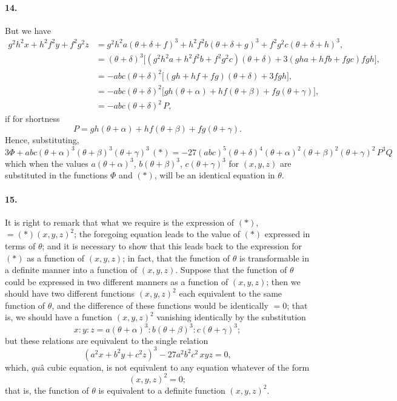 \documentclass[11pt,a4paper]{article}
\begin{document}
\paragraph{14.}
But we have
\[
\begin{aligned}
g^2 h^2 x + h^2 f^2 y + f^2 g^2 z
 &= g^2 h^2 a (\theta + \delta + f)^3 + h^2 f^2 b (\theta + \delta + g)^3
    + f^2 g^2 c (\theta + \delta + h)^3, \\
 &= (\theta + \delta)^3 \bigl[ (g^2 h^2 a + h^2 f^2 b + f^2 g^2 c)(\theta + \delta)
    + 3 (gha + hfb + fgc) fgh \bigr], \\
 &= - abc (\theta + \delta)^2 \bigl[ (gh + hf + fg)(\theta + \delta) + 3 fgh \bigr], \\
 &= - abc (\theta + \delta)^2 \bigl[ gh(\theta + \alpha) + hf(\theta + \beta) + fg(\theta + \gamma) \bigr], \\
 &= - abc (\theta + \delta)^2 \, P,
\end{aligned}
\]
if for shortness
\[
P = gh(\theta + \alpha) + hf(\theta + \beta) + fg(\theta + \gamma).
\]
Hence, substituting,
\[
3 \Phi + abc (\theta + \alpha)^3 (\theta + \beta)^3 (\theta + \gamma)^3 \, (*)
 = - 27 (abc)^5 (\theta + \delta)^4
   (\theta + \alpha)^2 (\theta + \beta)^2 (\theta + \gamma)^2 \, P^3 Q
\]
which when the values $a(\theta + \alpha)^3$, $b(\theta + \beta)^3$, $c(\theta + \gamma)^3$
for $(x, y, z)$ are substituted in the functions $\Phi$ and $(*)$, will be an identical
equation in $\theta$.

\paragraph{15.}
It is right to remark that what we require is the expression of $(*)$, $= (*)(x, y, z)^2$;
the foregoing equation leads to the value of $(*)$ expressed in terms of $\theta$; and it
is necessary to show that this leads back to the expression for $(*)$ as a function of
$(x, y, z)$; in fact, that the function of $\theta$ is transformable in a definite manner
into a function of $(x, y, z)$. Suppose that the function of $\theta$ could be expressed
in two different manners as a function of $(x, y, z)$; then we should have two different
functions $(x, y, z)^2$ each equivalent to the same function of $\theta$, and the
difference of these functions would be identically $= 0$; that is, we should have a
function $(x, y, z)^2$ vanishing identically by the substitution
\[
x : y : z = a(\theta + \alpha)^3 : b(\theta + \beta)^3 : c(\theta + \gamma)^3;
\]
but these relations are equivalent to the single relation
\[
(a^2 x + b^2 y + c^2 z)^3 - 27 a^2 b^2 c^2 \, xyz = 0,
\]
which, $\textit{qu\^a}$ cubic equation, is not equivalent to any equation whatever of the form
\[
(x, y, z)^2 = 0;
\]
that is, the function of $\theta$ is equivalent to a definite function $(x, y, z)^2$.
\end{document}
